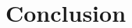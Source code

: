 \documentclass[preprint,12pt,3p]{elsarticle}
\begin{document}
\section{Conclusion}
\label{conclusion}





\begin{thebibliography}{00}


\bibitem{}

\end{thebibliography}
\end{document}
